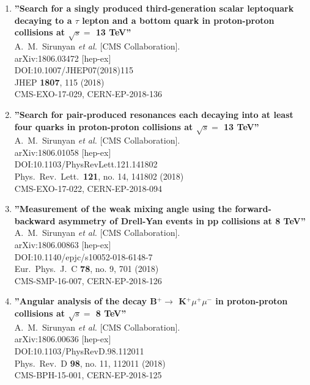 \begin{enumerate}
\item%
{\bf ''Search for a singly produced third-generation scalar leptoquark decaying to a $\tau$ lepton and a bottom quark in proton-proton collisions at $\sqrt{s} =$ 13 TeV''}
  \\{}A.~M.~Sirunyan {\it et al.} [CMS Collaboration].
  \\{}arXiv:1806.03472 [hep-ex]
  \\{}DOI:10.1007/JHEP07(2018)115
  \\{}JHEP {\bf 1807}, 115 (2018)
  \\{}CMS-EXO-17-029, CERN-EP-2018-136

\item%
{\bf ''Search for pair-produced resonances each decaying into at least four quarks in proton-proton collisions at $\sqrt{s}=$ 13 TeV''}
  \\{}A.~M.~Sirunyan {\it et al.} [CMS Collaboration].
  \\{}arXiv:1806.01058 [hep-ex]
  \\{}DOI:10.1103/PhysRevLett.121.141802
  \\{}Phys.\ Rev.\ Lett.\  {\bf 121}, no. 14, 141802 (2018)
  \\{}CMS-EXO-17-022, CERN-EP-2018-094

\item%
{\bf ''Measurement of the weak mixing angle using the forward-backward asymmetry of Drell-Yan events in pp collisions at 8 TeV''}
  \\{}A.~M.~Sirunyan {\it et al.} [CMS Collaboration].
  \\{}arXiv:1806.00863 [hep-ex]
  \\{}DOI:10.1140/epjc/s10052-018-6148-7
  \\{}Eur.\ Phys.\ J.\ C {\bf 78}, no. 9, 701 (2018)
  \\{}CMS-SMP-16-007, CERN-EP-2018-126

\item%
{\bf ''Angular analysis of the decay B$^+$$\to$ K$^+\mu^+\mu^-$ in proton-proton collisions at $\sqrt{s} =$ 8 TeV''}
  \\{}A.~M.~Sirunyan {\it et al.} [CMS Collaboration].
  \\{}arXiv:1806.00636 [hep-ex]
  \\{}DOI:10.1103/PhysRevD.98.112011
  \\{}Phys.\ Rev.\ D {\bf 98}, no. 11, 112011 (2018)
  \\{}CMS-BPH-15-001, CERN-EP-2018-125


\end{enumerate}
